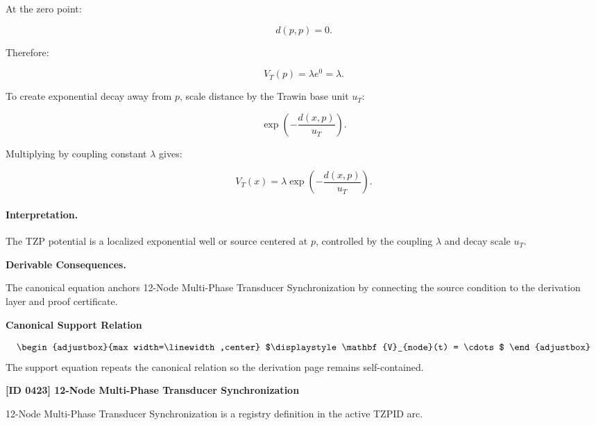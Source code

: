 At the zero point:

\begin{equation}
d(p,p)=0 .
\end{equation}

Therefore:

\begin{equation}
V_T(p)=\lambda e^0=\lambda .
\end{equation}

To create exponential decay away from $p$, scale distance by the Trawin base unit $u_T$:

\begin{equation}
\exp\left(-\frac{d(x,p)}{u_T}\right).
\end{equation}

Multiplying by coupling constant $\lambda$ gives:

\begin{equation}
\boxed{
V_T(x)
=
\lambda
\exp\left(
-\frac{d(x,p)}{u_T}
\right).
}
\end{equation}

\paragraph{Interpretation.}
The TZP potential is a localized exponential well or source centered at $p$, controlled by the coupling $\lambda$ and decay scale $u_T$.

\par\vspace{0.35em}
\noindent\textbf{Derivable Consequences.}\quad
\begingroup
\footnotesize
\raggedright
The canonical equation anchors 12-Node Multi-Phase Transducer Synchronization by connecting the source condition to the derivation layer and proof certificate.
\par\endgroup

\noindent\textbf{Canonical Support Relation}\par
\[
\begin{adjustbox}{max width=\linewidth,center}
$\displaystyle
\mathbf{V}_{node}(t) = \cdots
$
\end{adjustbox}
\]
\noindent The support equation repeats the canonical relation so the derivation page remains self-contained.\par

\clearpage
\noindent\textbf{[ID 0423] 12-Node Multi-Phase Transducer Synchronization}\par
\vspace{0.35em}
\begingroup\small
{}
12-Node Multi-Phase Transducer Synchronization is a registry definition in the active TZPID arc.

